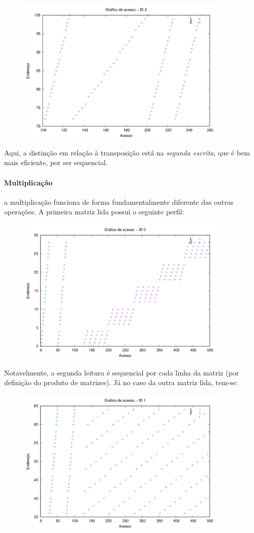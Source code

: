 \documentclass{article}
\begin{document}
\begin{figure} [H]
    \includegraphics[width=10cm]{s-acesso-2.png} 
    \centering
\end{figure}

Aqui, a distinção em relação à transposição está na \textit{segunda escrita}, que é bem mais eficiente, por ser sequencial.

\paragraph{Multiplicação} a multiplicação funciona de forma fundamentalmente diferente das outras operações. A primeira matriz lida possui o seguinte perfil:

\begin{figure} [H]
    \includegraphics[width=10cm]{m-acesso-0.png} 
    \centering
\end{figure}

Notavelmente, a segunda leitura é sequencial por cada linha da matriz (por definição do produto de matrizes). Já no caso da outra matriz lida, tem-se:

\begin{figure} [H]
    \includegraphics[width=10cm]{m-acesso-1.png} 
    \centering
\end{figure}
\end{document}
